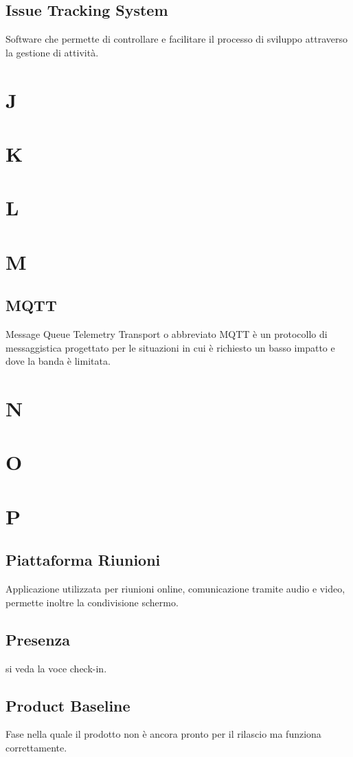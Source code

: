 \subsection{Issue Tracking System}
Software che permette di controllare e facilitare il processo di sviluppo attraverso la gestione di attività.
\newpage
\section{J}
\section{K}
\section{L}
\section{M}
\subsection{MQTT}
Message Queue Telemetry Transport o abbreviato MQTT è un protocollo di messaggistica progettato per le situazioni in cui è richiesto
un basso impatto e dove la banda è limitata.
\newpage
\section{N}
\section{O}
\section{P}
\subsection{Piattaforma Riunioni}
Applicazione utilizzata per riunioni online, comunicazione tramite audio e video, permette inoltre la condivisione schermo.
\subsection{Presenza}
si veda la voce check-in.
\newpage
\subsection{Product Baseline}
Fase nella quale il prodotto non è ancora pronto per il rilascio ma funziona correttamente.
